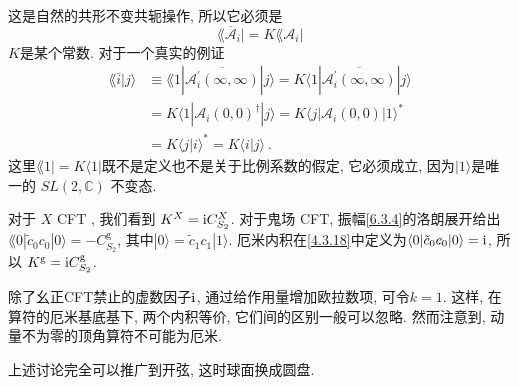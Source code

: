 这是自然的共形不变共轭操作, 所以它必须是
\begin{equation}
	\lAngle\overline{\mathscr{A}}_{i} |=K\lAngle\mathscr{A}_{i}| \label{6.7.32}
\end{equation}
$K$是某个常数. 对于一个真实的例证
	\begin{align}
		\lAngle\bar{i} \vert j\rangle & 
		\equiv \lAngle 1 |\overline{\mathscr{A}_{i}^{\prime}(\infty, \infty)}| j\rangle
		=K \langle 1|\overline{\mathscr{A}_{i}^{\prime}(\infty, \infty)}| j\rangle  \nonumber \\
		&=K \langle 1 |\mathscr{A}_{i}(0,0)^{\dagger}| j\rangle=K\langle j|\mathscr{A}_{i}(0,0)| 1\rangle^{*} \nonumber \\
		&=K\langle j \vert i\rangle^{*} = K\langle i \vert j\rangle \:. \label{6.7.33}
	\end{align}
这里$\lAngle 1|=K\langle 1|$既不是定义也不是关于比例系数的假定, 它必须成立, 因为$|1\rangle$是唯一的 $SL(2, \mathds{C})$ 不变态.

对于 $X$ CFT , 我们看到 $K^{X}=\mathrm{i} C_{S_{2}}^{X}$. 对于鬼场 CFT, 振幅\eqref{6.3.4}的洛朗展开给出$\lAngle 0|\tilde{c}_{0} c_{0}|0\rangle=-C_{S_{2}}^{\mathrm{g}}$, 其中$|0\rangle=\tilde{c}_{1} c_{1}|1\rangle$.  厄米内积在\eqref{4.3.18}中定义为$\langle 0|\tilde{c}_{0} c_{0}| 0\rangle=\mathrm{i}$, 
所以 $K^{\mathrm{g}} = \mathrm{i} C_{S_{2}}^{\mathrm{g}}$.

除了幺正CFT禁止的虚数因子$\mathrm{i}$, 通过给作用量增加欧拉数项, 可令$k=1$. 这样, 在算符的厄米基底基下, 两个内积等价, 它们间的区别一般可以忽略. 
然而注意到, 动量不为零的顶角算符不可能为厄米.

上述讨论完全可以推广到开弦, 这时球面换成圆盘.
